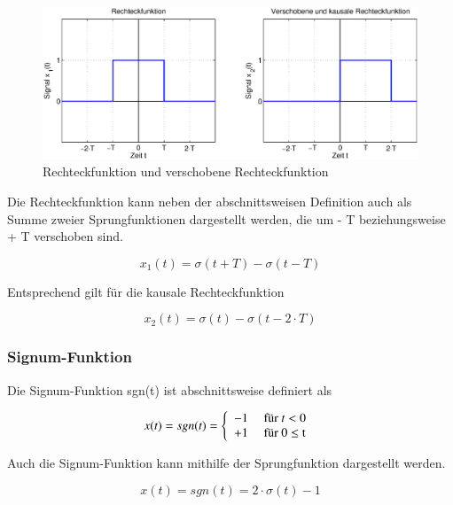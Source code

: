 \begin{figure}[ht]
  \includegraphics[width=1.0\textwidth]{Kapitel1/Bilder/image7}
  \caption{Rechteckfunktion und verschobene Rechteckfunktion}
  \label{fig:Rechteck}
\end{figure}


\noindent Die Rechteckfunktion kann neben der abschnittsweisen Definition auch als Summe zweier Sprungfunktionen dargestellt werden, die um - T beziehungsweise + T verschoben sind.

\begin{equation}\label{eq:onetwentyseven}
x_{1} \left(t\right)=\sigma \left(t+T\right)-\sigma \left(t-T\right)
\end{equation}


\noindent Entsprechend gilt f\"{u}r die kausale Rechteckfunktion

\begin{equation}\label{eq:onetwentyeight}
x_{2} \left(t\right)=\sigma \left(t\right)-\sigma \left(t-2\cdot T\right)
\end{equation}


\subsubsection{ Signum-Funktion }

\noindent Die Signum-Funktion sgn(t) ist abschnittsweise definiert als


\begin{equation}\label{eq:onetwentynine}
x(t)=sgn(t)=\left\{\begin{array}{l} {-{\rm 1\; }\quad \text{für } t<0} \\ 
{+1{\rm \; }\quad \text{für } 0 \le {\rm t\; }} \end{array}\right.
\end{equation}

\noindent Auch die Signum-Funktion kann mithilfe der Sprungfunktion dargestellt werden.

\begin{equation}\label{eq:onethirty}
x(t)=sgn(t)=2\cdot \sigma (t)-1
\end{equation}


